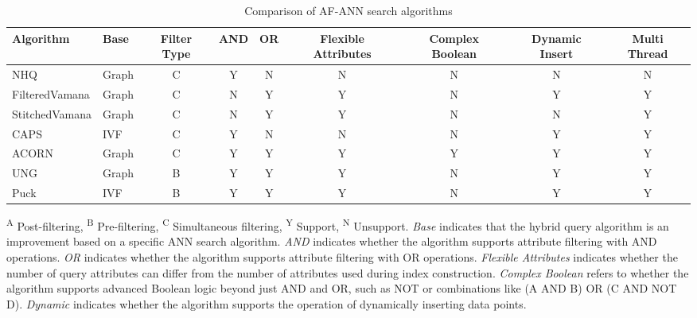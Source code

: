 \documentclass[sigconf, nonacm]{acmart}
\begin{document}
\setlength{\textfloatsep}{0cm}
\setlength{\floatsep}{0cm}
\begin{table}[t]
	\centering
      \setlength{\abovecaptionskip}{0.1cm}
     \setlength{\belowcaptionskip}{-0.2cm}
	\caption{Comparison of AF-ANN search algorithms}
	\small
	\label{tab:compair_1}
    \begin{tabular}{|l|l|c|c|c|c|c|c|c|}
		\hline
        \textbf{Algorithm} & \textbf{Base} & \textbf{Filter Type} & \textbf{AND} & \textbf{OR} & \textbf{Flexible Attributes} & \textbf{Complex Boolean} & \textbf{Dynamic Insert} & \textbf{Multi Thread} \\
		\hline
         NHQ & Graph & C & Y & N& N& N & N & N \\
         FilteredVamana & Graph & C & N & Y & Y & N & Y & Y \\
	StitchedVamana & Graph & C & N & Y & Y & N & N & Y  \\
        CAPS & IVF & C & Y & N & N & N & Y & Y \\
        ACORN & Graph & C & Y & Y & Y & Y & Y & Y \\
       UNG & Graph & B & Y & Y & Y & N & Y & Y \\ 
        Puck & IVF & B & Y & Y & Y & N & Y & Y \\
		
		\hline

	\end{tabular}

  
	\centering
    \footnotesize{
	\begin{minipage}{\linewidth}
		\vspace{0.1cm}
		\textsuperscript{A} Post-filtering, 
		\textsuperscript{B} Pre-filtering, 
		\textsuperscript{C} Simultaneous filtering, 
		\textsuperscript{Y} Support, 
		\textsuperscript{N} Unsupport. 
		\textit{Base} indicates that the hybrid query algorithm is an improvement based on a specific ANN search algorithm. 
		\textit{AND} indicates whether the algorithm supports attribute filtering with AND operations. 
		\textit{OR} indicates whether the algorithm supports attribute filtering with OR operations. 
		\textit{Flexible Attributes} indicates whether the number of query attributes can differ from the number of attributes used during index construction. 
		\textit{Complex Boolean} refers to whether the algorithm supports advanced Boolean logic beyond just AND and OR, such as NOT or combinations like (A AND B) OR (C AND NOT D). 
		\textit{Dynamic} indicates whether the algorithm supports the operation of dynamically inserting data points.
	\end{minipage}}
  \vspace{-0.3cm}
\end{table}
\end{document}
